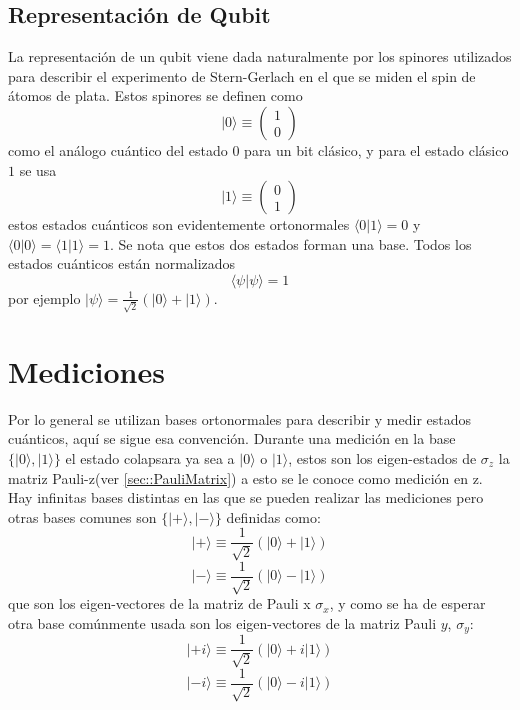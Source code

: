 \documentclass[a4paper]{article}
\begin{document}
\subsection{Representación de Qubit}
La representación de un qubit viene dada naturalmente por los spinores utilizados para describir el experimento de Stern-Gerlach en el que se miden el spin de átomos de plata. Estos spinores se definen como 
\begin{equation}\label{eq::qubit0}
|0\rangle\equiv
\begin{pmatrix}
		1\\
		0
	\end{pmatrix}
\end{equation}
como el análogo cuántico del estado $0$ para un bit clásico, y para el estado clásico $1$ se usa
\begin{equation}\label{eq::qubit1}
|1\rangle\equiv
\begin{pmatrix}
		0\\
		1
	\end{pmatrix}
\end{equation}
estos estados cuánticos son evidentemente ortonormales $\langle 0 | 1\rangle=0$ y $\langle 0 | 0\rangle=\langle 1 | 1\rangle=1$. Se nota que estos dos estados forman una base. Todos los estados cuánticos están normalizados
\begin{equation}
\langle \psi | \psi\rangle=1
\end{equation}
por ejemplo $|\psi\rangle=\frac{1}{\sqrt{2}}(|0\rangle+|1\rangle)$.
\section{Mediciones}
Por lo general se utilizan bases ortonormales para describir y medir estados cuánticos, aquí se sigue esa convención. Durante una medición en la base $\{|0\rangle, |1\rangle\}$ el estado colapsara ya sea a $|0\rangle$ o $|1\rangle$, estos son los eigen-estados de $\sigma_z$ la matriz Pauli-z(ver \ref{sec::PauliMatrix}) a esto se le conoce como medición en z.\\
Hay infinitas bases distintas en las que se pueden realizar las mediciones pero otras bases comunes son $\{|+\rangle, |-\rangle \}$ definidas como:
\begin{equation}
|+\rangle\equiv\frac{1}{\sqrt{2}}(|0\rangle+|1\rangle)
\end{equation}
\begin{equation}
|-\rangle\equiv\frac{1}{\sqrt{2}}(|0\rangle-|1\rangle)
\end{equation}
que son los eigen-vectores de la matriz de Pauli x $\sigma_x$, y como se ha de esperar otra base comúnmente usada son los eigen-vectores de la matriz Pauli $y$, $\sigma_y$:
\begin{equation}
|+i\rangle\equiv\frac{1}{\sqrt{2}}(|0\rangle+i|1\rangle)
\end{equation}
\begin{equation}
|-i\rangle\equiv\frac{1}{\sqrt{2}}(|0\rangle-i|1\rangle)
\end{equation}
\end{document}
